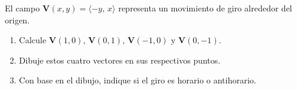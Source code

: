 El campo $\mathbf{V}(x,y)=\langle -y,\,x\rangle$ representa un movimiento de giro alrededor del origen.
\begin{enumerate}
    \item Calcule $\mathbf{V}(1,0)$, $\mathbf{V}(0,1)$, $\mathbf{V}(-1,0)$ y $\mathbf{V}(0,-1)$.
    \item Dibuje estos cuatro vectores en sus respectivos puntos.
    \item Con base en el dibujo, indique si el giro es horario o antihorario.
\end{enumerate}
